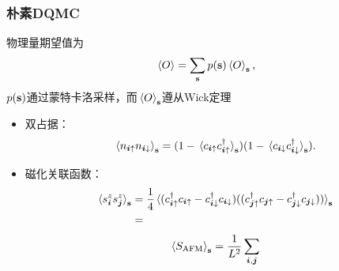 \documentclass[UTF8]{ctexbeamer}
\begin{document}
\begin{frame}
\frametitle{朴素DQMC}

物理量期望值为
\begin{equation}
    \expval*{O} = \sum_{\vb{s}} p(\vb{s}) \expval*{O}_{\vb{s}},
\end{equation}    
$p(\vb{s})$通过蒙特卡洛采样，而$\expval*{O}_{\vb{s}}$遵从Wick定理

\begin{itemize}
    \item 双占据：
    \begin{equation}
        \expval*{n_{\vb*{i} \uparrow} n_{\vb*{i} \downarrow}}_{\vb{s}} = (1 - \expval*{c_{\vb*{i} \uparrow} c^\dagger_{\vb*{i} \uparrow}}_{\vb{s}})  (1 - \expval*{c_{\vb*{i} \downarrow} c^\dagger_{\vb*{i} \downarrow}}_{\vb{s}}).
    \end{equation}
    \item 磁化关联函数：
    \begin{equation}
        \begin{aligned}
            \expval*{s^z_{\vb*{i}} s^z_{\vb*{j}}}_{\vb{s}} &= \frac{1}{4} \expval*{(c^\dagger_{\vb*{i} \uparrow} c_{\vb*{i} \uparrow} - c^\dagger_{\vb*{i} \downarrow} c_{\vb*{i} \downarrow}) ((c^\dagger_{\vb*{j} \uparrow} c_{\vb*{j} \uparrow} - c^\dagger_{\vb*{j} \downarrow} c_{\vb*{j} \downarrow}))}_{\vb{s}} \\
            &= 
        \end{aligned}
    \end{equation}
    \begin{equation}
        \expval*{S_\text{AFM}}_{\vb{s}} = \frac{1}{L^2} \sum_{\vb*{i}, \vb*{j}} 
    \end{equation}
\end{itemize}

\end{frame}
\end{document}

